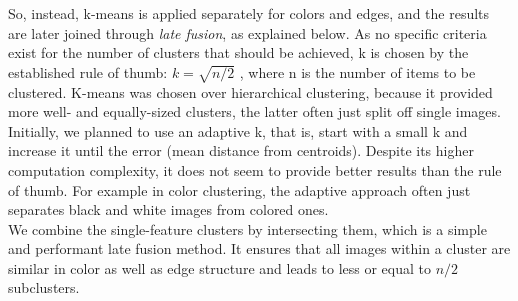 \bigskip
So, instead, k-means is applied separately for colors and edges, and the results are later joined through \emph{late fusion}, as explained below. As no specific criteria exist for the number of clusters that should be achieved, k is chosen by the established rule of thumb: $ k = \sqrt{n/2} $ \cite[p.365]{mardia1979}, where n is the number of items to be clustered. K-means was chosen over hierarchical clustering, because it provided more well- and equally-sized clusters, the latter often just split off single images.\\
Initially, we planned to use an adaptive k, that is, start with a small k and increase it until the error (mean distance from centroids). Despite its higher computation complexity, it does not seem to provide better results than the rule of thumb. For example in color clustering, the adaptive approach often just separates black and white images from colored ones.\\
We combine the single-feature clusters by intersecting them, which is a simple and performant late fusion method. It ensures that all images within a cluster are similar in color as well as edge structure and leads to less or equal to $ n/2 $ subclusters.
